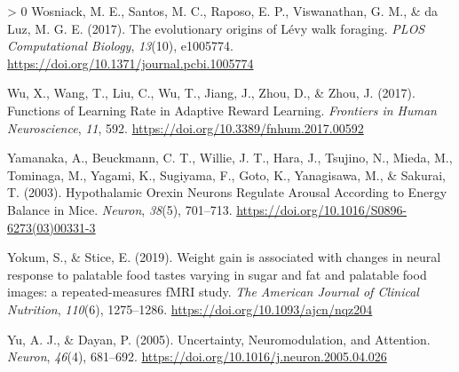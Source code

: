 \documentclass[
]{/home/nicoluarte/Downloads/templates/PNAS-template-main.tex}
\newlength{\cslhangindent}
\newenvironment{CSLReferences}[3] %
 {%
  \setlength{\parindent}{0pt}
  \ifodd #1 \everypar{\setlength{\hangindent}{\cslhangindent}}\ignorespaces\fi
  \ifnum #2 > 0
  \setlength{\parskip}{#2\baselineskip}
  \fi
 }%
 {}
\begin{document}
\begin{CSLReferences}{1}{0}
\leavevmode\hypertarget{ref-V2XKZN75}{}%
Wosniack, M. E., Santos, M. C., Raposo, E. P., Viswanathan, G. M., \& da
Luz, M. G. E. (2017). The evolutionary origins of Lévy walk foraging.
\emph{PLOS Computational Biology}, \emph{13}(10), e1005774.
\url{https://doi.org/10.1371/journal.pcbi.1005774}

\leavevmode\hypertarget{ref-MYWY9LWC}{}%
Wu, X., Wang, T., Liu, C., Wu, T., Jiang, J., Zhou, D., \& Zhou, J.
(2017). Functions of Learning Rate in Adaptive Reward Learning.
\emph{Frontiers in Human Neuroscience}, \emph{11}, 592.
\url{https://doi.org/10.3389/fnhum.2017.00592}

\leavevmode\hypertarget{ref-KPIHYUYF}{}%
Yamanaka, A., Beuckmann, C. T., Willie, J. T., Hara, J., Tsujino, N.,
Mieda, M., Tominaga, M., Yagami, K., Sugiyama, F., Goto, K., Yanagisawa,
M., \& Sakurai, T. (2003). Hypothalamic Orexin Neurons Regulate Arousal
According to Energy Balance in Mice. \emph{Neuron}, \emph{38}(5),
701--713. \url{https://doi.org/10.1016/S0896-6273(03)00331-3}

\leavevmode\hypertarget{ref-LFEELSI4}{}%
Yokum, S., \& Stice, E. (2019). Weight gain is associated with changes
in neural response to palatable food tastes varying in sugar and fat and
palatable food images: a repeated-measures fMRI study. \emph{The
American Journal of Clinical Nutrition}, \emph{110}(6), 1275--1286.
\url{https://doi.org/10.1093/ajcn/nqz204}

\leavevmode\hypertarget{ref-W3DEZPKU}{}%
Yu, A. J., \& Dayan, P. (2005). Uncertainty, Neuromodulation, and
Attention. \emph{Neuron}, \emph{46}(4), 681--692.
\url{https://doi.org/10.1016/j.neuron.2005.04.026}

\end{CSLReferences}

\newpage
\end{document}
